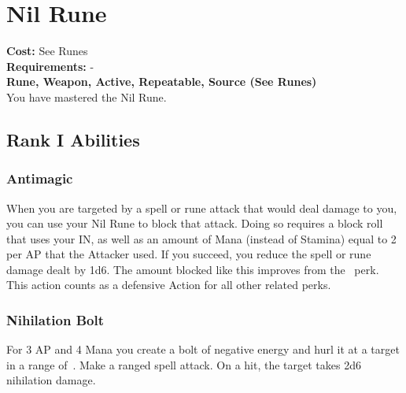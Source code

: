 \section{Nil Rune}\label{rune:nil}
\textbf{Cost:} See Runes\\
\textbf{Requirements:} -\\
\textbf{Rune, Weapon, Active, Repeatable, Source (See Runes)}\\
You have mastered the Nil Rune.

\subsection{Rank I Abilities}

\subsubsection{Antimagic}
When you are targeted by a spell or rune attack that would deal damage to you, you can use your Nil Rune to block that attack.
Doing so requires a block roll that uses your IN, as well as an amount of Mana (instead of Stamina) equal to 2 per AP that the Attacker used.
If you succeed, you reduce the spell or rune damage dealt by 1d6.
The amount blocked like this improves from the~ perk.
This action counts as a defensive Action for all other related perks.

\subsubsection{Nihilation Bolt}
For 3 AP and 4 Mana you create a bolt of negative energy and hurl it at a target in a range of~.
Make a ranged spell attack.
On a hit, the target takes 2d6 nihilation damage.